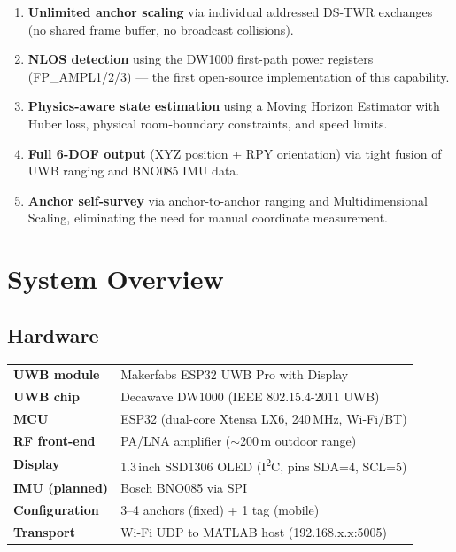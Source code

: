 \documentclass[11pt,a4paper]{article}
\begin{document}
\begin{enumerate}[leftmargin=2em]
  \item \textbf{Unlimited anchor scaling} via individual addressed DS-TWR exchanges (no shared frame buffer, no broadcast collisions).
  \item \textbf{NLOS detection} using the DW1000 first-path power registers (FP\_AMPL1/2/3) — the first open-source implementation of this capability.
  \item \textbf{Physics-aware state estimation} using a Moving Horizon Estimator with Huber loss, physical room-boundary constraints, and speed limits.
  \item \textbf{Full 6-DOF output} (XYZ position + RPY orientation) via tight fusion of UWB ranging and BNO085 IMU data.
  \item \textbf{Anchor self-survey} via anchor-to-anchor ranging and Multidimensional Scaling, eliminating the need for manual coordinate measurement.

\end{enumerate}

\section{System Overview}

\subsection{Hardware}

\begin{keybox}
\begin{tabular}{ll}
  \textbf{UWB module} & Makerfabs ESP32 UWB Pro with Display \\
  \textbf{UWB chip}   & Decawave DW1000 (IEEE 802.15.4-2011 UWB) \\
  \textbf{MCU}        & ESP32 (dual-core Xtensa LX6, 240\,MHz, Wi-Fi/BT) \\
  \textbf{RF front-end} & PA/LNA amplifier ($\sim$200\,m outdoor range) \\
  \textbf{Display}    & 1.3\,inch SSD1306 OLED (I\textsuperscript{2}C, pins SDA=4, SCL=5) \\
  \textbf{IMU (planned)} & Bosch BNO085 via SPI \\
  \textbf{Configuration} & 3--4 anchors (fixed) + 1 tag (mobile) \\
  \textbf{Transport}  & Wi-Fi UDP to MATLAB host (192.168.x.x:5005) \\
\end{tabular}
\end{keybox}
\end{document}
